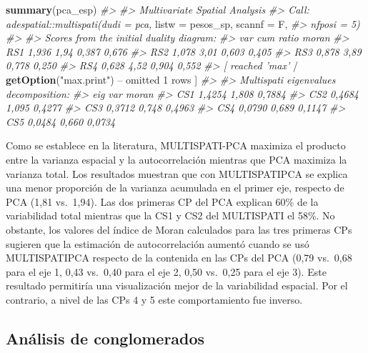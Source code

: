 \documentclass[11pt,b5paper,]{krantz}
\newenvironment{Shaded}{}{}
\newcommand{\KeywordTok}[1]{\textcolor[rgb]{0.00,0.44,0.13}{\textbf{#1}}}
\newcommand{\DecValTok}[1]{\textcolor[rgb]{0.25,0.63,0.44}{#1}}
\newcommand{\StringTok}[1]{\textcolor[rgb]{0.25,0.44,0.63}{#1}}
\newcommand{\CommentTok}[1]{\textcolor[rgb]{0.38,0.63,0.69}{\textit{#1}}}
\newcommand{\OperatorTok}[1]{\textcolor[rgb]{0.40,0.40,0.40}{#1}}
\newcommand{\NormalTok}[1]{#1}
\begin{document}
\begin{Shaded}
\begin{Highlighting}[]
\KeywordTok{summary}\NormalTok{(pca_esp)}
\CommentTok{#>}
\CommentTok{#> Multivariate Spatial Analysis}
\CommentTok{#> Call: adespatial::multispati(dudi = pca,}
\NormalTok{listw =}\StringTok{ }\NormalTok{pesos_sp, scannf =}\StringTok{ }\NormalTok{F,}
\CommentTok{#> nfposi = 5)}
\CommentTok{#>}
\CommentTok{#> Scores from the initial duality diagram:}
\CommentTok{#> var cum ratio moran}
\CommentTok{#> RS1 1,936 1,94 0,387 0,676}
\CommentTok{#> RS2 1,078 3,01 0,603 0,405}
\CommentTok{#> RS3 0,878 3,89 0,778 0,250}
\CommentTok{#> RS4 0,628 4,52 0,904 0,552}
\CommentTok{#> [ reached 'max'}
    \OperatorTok{/}\StringTok{ }\KeywordTok{getOption}\NormalTok{(}\StringTok{"max.print"}\NormalTok{) }\OperatorTok{--}
\NormalTok{omitted }\DecValTok{1}\NormalTok{ rows ]}
\CommentTok{#>}
\CommentTok{#> Multispati eigenvalues decomposition:}
\CommentTok{#> eig var moran}
\CommentTok{#> CS1 1,4254 1,808 0,7884}
\CommentTok{#> CS2 0,4684 1,095 0,4277}
\CommentTok{#> CS3 0,3712 0,748 0,4963}
\CommentTok{#> CS4 0,0790 0,689 0,1147}
\CommentTok{#> CS5 0,0484 0,660 0,0734}
\end{Highlighting}
\end{Shaded}

Como se establece en la literatura, MULTISPATI-PCA maximiza el producto
entre la varianza espacial y la autocorrelación mientras que PCA
maximiza la varianza total. Los resultados muestran que con
MULTISPATIPCA se explica una menor proporción de la varianza acumulada
en el primer eje, respecto de PCA (1,81 vs.~1,94). Las dos primeras CP
del PCA explican 60\% de la variabilidad total mientras que la CS1 y CS2
del MULTISPATI el 58\%. No obstante, los valores del índice de Moran
calculados para las tres primeras CPs sugieren que la estimación de
autocorrelación aumentó cuando se usó MULTISPATIPCA respecto de la
contenida en las CPs del PCA (0,79 vs.~0,68 para el eje 1, 0,43 vs.~0,40
para el eje 2, 0,50 vs.~0,25 para el eje 3). Este resultado permitiría
una visualización mejor de la variabilidad espacial. Por el contrario, a
nivel de las CPs 4 y 5 este comportamiento fue inverso.

\subsection{Análisis de
conglomerados}\label{anuxe1lisis-de-conglomerados-1}
\end{document}
